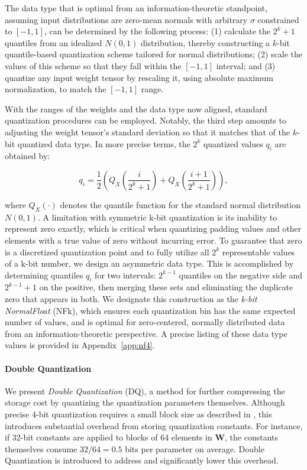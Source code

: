 The data type that is optimal from an information-theoretic standpoint, assuming input distributions are zero-mean normals with arbitrary $\sigma$ constrained to $[-1, 1]$, can be determined by the following process: (1) calculate the $2^k + 1$ quantiles from an idealized $N(0, 1)$ distribution, thereby constructing a $k$-bit quantile-based quantization scheme tailored for normal distributions; (2) scale the values of this scheme so that they fall within the $[-1, 1]$ interval; and (3) quantize any input weight tensor by rescaling it, using absolute maximum normalization, to match the $[-1, 1]$ range.

With the ranges of the weights and the data type now aligned, standard quantization procedures can be employed. Notably, the third step amounts to adjusting the weight tensor’s standard deviation so that it matches that of the $k$-bit quantized data type. In more precise terms, the $2^k$ quantized values $q_i$ are obtained by:

\begin{equation}
q_i  = \frac{1}{2}\left( Q_X\left(\frac{i}{2^k+1}\right) + Q_X\left(\frac{i+1}{2^k+1}\right)\right),
\end{equation}

where $Q_X(\cdot)$ denotes the quantile function for the standard normal distribution $N(0,1)$. A limitation with symmetric k-bit quantization is its inability to represent zero exactly, which is critical when quantizing padding values and other elements with a true value of zero without incurring error. To guarantee that zero is a discretized quantization point and to fully utilize all $2^k$ representable values of a k-bit number, we design an asymmetric data type. This is accomplished by determining quantiles $q_i$ for two intervals: $2^{k-1}$ quantiles on the negative side and $2^{k-1}+1$ on the positive, then merging these sets and eliminating the duplicate zero that appears in both. We designate this construction as the \emph{k-bit NormalFloat} (NFk), which ensures each quantization bin has the same expected number of values, and is optimal for zero-centered, normally distributed data from an information-theoretic perspective. A precise listing of these data type values is provided in Appendix~\ref{app:nf4}.

\paragraph{Double Quantization{}} 
We present \emph{Double Quantization} (DQ), a method for further compressing the storage cost by quantizing the quantization parameters themselves. Although precise 4-bit quantization requires a small block size as described in \citet{dettmers2022case}, this introduces substantial overhead from storing quantization constants. For instance, if 32-bit constants are applied to blocks of 64 elements in $\mathbf{W}$, the constants themselves consume $32/64 = 0.5$ bits per parameter on average. Double Quantization is introduced to address and significantly lower this overhead.

